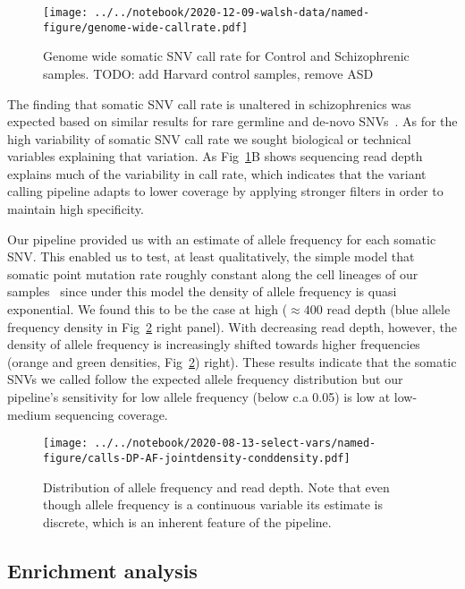 \documentclass[letterpaper]{article}
\begin{document}
\begin{figure}
\texttt{[image: ../../notebook/2020-12-09-walsh-data/named-figure/genome-wide-callrate.pdf]}
\caption{Genome wide somatic SNV call rate for Control and Schizophrenic samples.  TODO:
	add Harvard control samples, remove ASD}
\label{fig:genomewide-calls}
\end{figure}

The finding that somatic SNV call rate is unaltered in schizophrenics was
expected based on similar results for rare germline and de-novo
SNVs~\citep{Purcell2014,Singh2017,Fromer2014,Rees2020}.
As for the high variability of somatic SNV call rate we sought 
biological or technical variables explaining that variation.  As
Fig~\ref{fig:genomewide-calls}B
shows sequencing read depth explains much of
the variability in call rate, which indicates that the variant calling
pipeline adapts to lower coverage by applying stronger filters in order to 
maintain high specificity.

Our pipeline provided us with an estimate of allele frequency for
each somatic SNV.  This enabled us to test, at least qualitatively, the
simple model that somatic point mutation rate roughly constant along the cell lineages of
our samples~\citep{Rodin2021} since under this model the density of allele
frequency is quasi exponential.  We found this to be the case at high
(\(\approx 400\) read depth (blue allele frequency density in Fig~\ref{fig:AF}
right panel).  With decreasing read depth,
however, the density of allele frequency is increasingly shifted towards
higher frequencies (orange and green densities, Fig~\ref{fig:AF})
right).  These results indicate that the somatic SNVs we called
follow the expected allele frequency distribution but our pipeline's sensitivity for
low allele frequency (below c.a 0.05) is low at low-medium sequencing
coverage.

\begin{figure}
\texttt{[image: ../../notebook/2020-08-13-select-vars/named-figure/calls-DP-AF-jointdensity-conddensity.pdf]}
\caption{
Distribution of allele frequency and read depth.  Note that even though allele frequency is
a continuous variable its estimate is discrete, which is an inherent feature
of the pipeline.
}
\label{fig:AF}
\end{figure}

\subsection*{Enrichment analysis}
\end{document}
